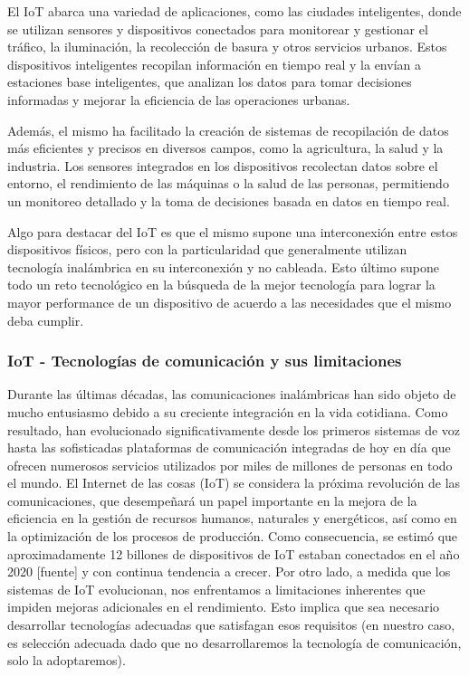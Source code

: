El IoT abarca una variedad de aplicaciones, como las ciudades inteligentes, donde se utilizan sensores y dispositivos conectados para monitorear y gestionar el tráfico, la iluminación, la recolección de basura y otros servicios urbanos. Estos dispositivos inteligentes recopilan información en tiempo real y la envían a estaciones base inteligentes, que analizan los datos para tomar decisiones informadas y mejorar la eficiencia de las operaciones urbanas.

Además, el mismo ha facilitado la creación de sistemas de recopilación de datos más eficientes y precisos en diversos campos, como la agricultura, la salud y la industria. Los sensores integrados en los dispositivos recolectan datos sobre el entorno, el rendimiento de las máquinas o la salud de las personas, permitiendo un monitoreo detallado y la toma de decisiones basada en datos en tiempo real.

Algo para destacar del IoT es que el mismo supone una interconexión entre estos dispositivos físicos, pero con la particularidad que generalmente utilizan tecnología inalámbrica en su interconexión y no cableada. Esto último supone todo un reto tecnológico en la búsqueda de la mejor tecnología para lograr la mayor performance de un dispositivo de acuerdo a las necesidades que el mismo deba cumplir.


\subsubsection{IoT - Tecnologías de comunicación y sus limitaciones}
Durante las últimas décadas, las comunicaciones inalámbricas han sido objeto de mucho entusiasmo debido a su creciente integración en la vida cotidiana. Como resultado, han evolucionado significativamente desde los primeros sistemas de voz hasta las sofisticadas plataformas de comunicación integradas de hoy en día que ofrecen numerosos servicios utilizados por miles de millones de personas en todo el mundo. El Internet de las cosas (IoT) se considera la próxima revolución de las comunicaciones, que desempeñará un papel importante en la mejora de la eficiencia en la gestión de recursos humanos, naturales y energéticos, así como en la optimización de los procesos de producción. Como consecuencia, se estimó que aproximadamente 12 billones de dispositivos de IoT estaban conectados en el año 2020 [fuente] y con continua tendencia a crecer. Por otro lado, a medida que los sistemas de IoT evolucionan, nos enfrentamos a limitaciones inherentes que impiden mejoras adicionales en el rendimiento. Esto implica que sea necesario desarrollar tecnologías adecuadas que satisfagan esos requisitos (en nuestro caso, es selección adecuada dado que no desarrollaremos la tecnología de comunicación, solo la adoptaremos).

